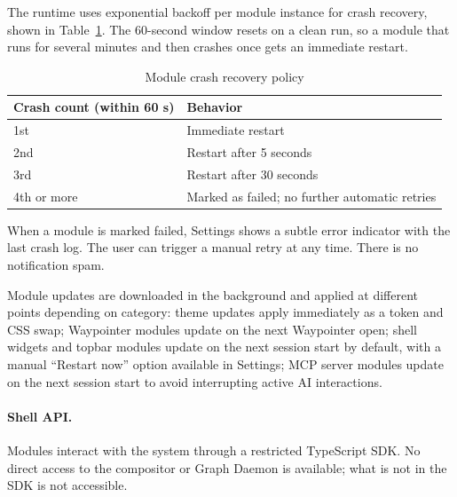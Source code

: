 The runtime uses exponential backoff per module instance for crash recovery,
shown in Table~\ref{tab:crash-recovery}. The 60-second window resets on a
clean run, so a module that runs for several minutes and then crashes once
gets an immediate restart.

\begin{table}[htbp]
\caption{Module crash recovery policy}
\label{tab:crash-recovery}
\begin{tabularx}{\linewidth}{lX}
\toprule
\textbf{Crash count (within 60 s)} & \textbf{Behavior} \\
\midrule
1st & Immediate restart \\
2nd & Restart after 5 seconds \\
3rd & Restart after 30 seconds \\
4th or more & Marked as failed; no further automatic retries \\
\bottomrule
\end{tabularx}
\end{table}

When a module is marked failed, Settings shows a subtle error indicator with
the last crash log. The user can trigger a manual retry at any time. There is
no notification spam.

Module updates are downloaded in the background and applied at different points
depending on category: theme updates apply immediately as a token and CSS swap;
Waypointer modules update on the next Waypointer open; shell widgets and topbar
modules update on the next session start by default, with a manual
``Restart now'' option available in Settings; MCP server modules update on the
next session start to avoid interrupting active AI interactions.

\paragraph{Shell API.}
Modules interact with the system through a restricted TypeScript SDK. No direct
access to the compositor or Graph Daemon is available; what is not in
the SDK is not accessible.

